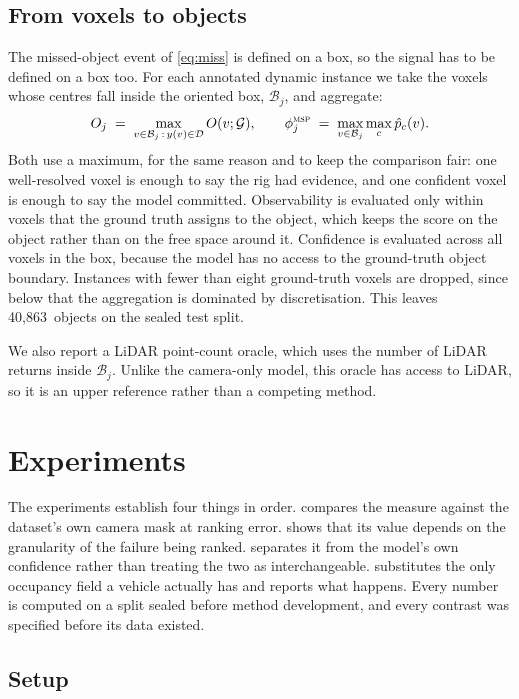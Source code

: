 \documentclass[10pt,twocolumn,letterpaper]{article}
\newcommand{\nObj}{40{,}863}
\begin{document}
\subsection{From voxels to objects}
\label{sec:agg}
The missed-object event of \cref{eq:miss} is defined on a box, so the
signal has to be defined on a box too. For each annotated dynamic instance
we take the voxels whose centres fall inside the oriented box,
$\mathcal{B}_j$, and aggregate:
\begin{equation}
O_j \;=\; \max_{v \in \mathcal{B}_j \,:\, y(v)\in\mathcal{D}} O(v;\mathcal{G}),
\qquad
\phi^{\textsc{msp}}_j \;=\; \max_{v \in \mathcal{B}_j} \max_c \hat{p}_c(v).
\label{eq:agg}
\end{equation}
Both use a maximum, for the same reason and to keep the comparison fair:
one well-resolved voxel is enough to say the rig had evidence, and one
confident voxel is enough to say the model committed. Observability is evaluated only within voxels that the ground truth
assigns to the object, which keeps the score on the object rather than on
the free space around it. Confidence is evaluated across all voxels in the
box, because the model has no access to the ground-truth object boundary.
Instances with fewer than eight ground-truth voxels are dropped, since
below that the aggregation is dominated by discretisation. This leaves
\nObj\ objects on the sealed test split.

We also report a LiDAR point-count oracle, which uses the number of LiDAR
returns inside $\mathcal{B}_j$. Unlike the camera-only model, this oracle
has access to LiDAR, so it is an upper reference rather than a competing
method.


\section{Experiments}

The experiments establish four things in order.  compares the
measure against the dataset's own camera mask at ranking error.
 shows that its value depends on the granularity of the
failure being ranked.  separates it from the model's own
confidence rather than treating the two as interchangeable.
 substitutes the only occupancy field a vehicle
actually has and reports what happens. Every number is computed on a split
sealed before method development, and every contrast was specified before
its data existed.

\subsection{Setup}
\end{document}
